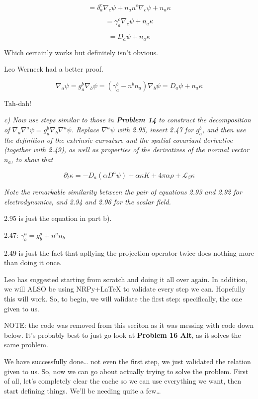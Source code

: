 \documentclass[landscape,letterpaper,10pt,english]{article}
\begin{document}
\[ = \delta_a^c \nabla_c \psi + n_a n^c \nabla_c \psi + n_a \kappa \]

\[ = \gamma_a^c \nabla_c \psi + n_a \kappa \]

\[ = D_a \psi + n_a \kappa \]

Which certainly works but definitely isn't obvious.

    Leo Werneck had a better proof.

\[ \nabla_a \psi = g^b_a \nabla_b \psi = (\gamma^b_a - n^bn_a)\nabla_b \psi = D_a \psi + n_a \kappa \]

Tah-dah!

    \emph{c) Now use steps similar to those in \textbf{Problem 14} to
construct the decomposition of
\(\nabla_a\nabla^a \psi = g^b_a \nabla_b \nabla^a \psi\). Replace
\(\nabla^a \psi\) with 2.95, insert 2.47 for \(g^b_a\), and then use the
definition of the extrinsic curvature and the spatial covariant
derivative (together with 2.49), as well as properties of the
derivatives of the normal vector \(n_a\), to show that}

\[ \partial_t \kappa = -D_a(\alpha D^a \psi) + \alpha \kappa K + 4\pi \alpha\rho + \mathcal{L}_\beta \kappa \]

\emph{Note the remarkable similarity between the pair of equations 2.93
and 2.92 for electrodynamics, and 2.94 and 2.96 for the scalar field.}

    2.95 is just the equation in part b).

2.47: \(\gamma^a_b = g^a_b + n^an_b\)

2.49 is just the fact that apllying the projection operator twice does
nothing more than doing it once.

    Leo has suggested starting from scratch and doing it all over again. In
addition, we will ALSO be using NRPy+LaTeX to validate every step we
can. Hopefully this will work. So, to begin, we will validate the first
step: specifically, the one given to us.

NOTE: the code was removed from this seciton as it was messing with code
down below. It's probably best to just go look at \textbf{Problem 16
Alt}, as it solves the same problem.

    We have successfully done\ldots{} not even the first step, we just
validated the relation given to us. So, now we can go about actually
trying to solve the problem. First of all, let's completely clear the
cache so we can use everything we want, then start defining things.
We'll be needing quite a few\ldots{}
\end{document}
